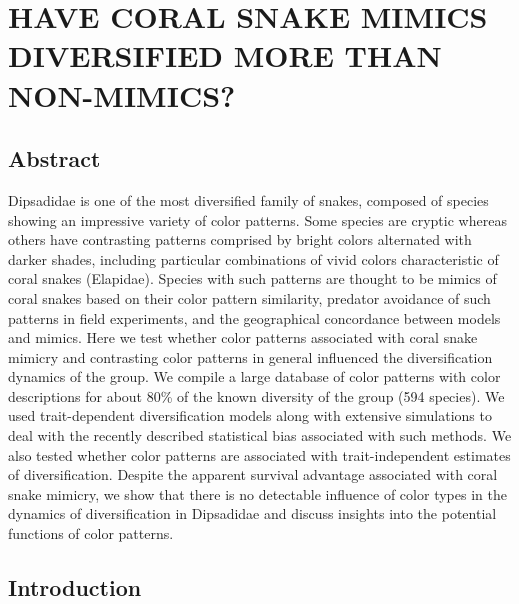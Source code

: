 
\chapter{HAVE CORAL SNAKE MIMICS DIVERSIFIED MORE THAN NON-MIMICS?}

\section{Abstract}

Dipsadidae is one of the most diversified family of snakes, composed of species showing an impressive variety of color patterns. Some species are cryptic whereas others have contrasting patterns comprised by bright colors alternated with darker shades, including particular combinations of vivid colors characteristic of coral snakes (Elapidae). Species with such patterns are thought to be mimics of coral snakes based on their color pattern similarity, predator avoidance of such patterns in field experiments, and the geographical concordance between models and mimics. Here we test whether color patterns associated with coral snake mimicry and contrasting color patterns in general influenced the diversification dynamics of the group. We compile a large database of color patterns with color descriptions for about 80\% of the known diversity of the group (594 species). We used trait-dependent diversification models along with extensive simulations to deal with the recently described statistical bias associated with such methods. We also tested whether color patterns are associated with trait-independent estimates of diversification. Despite the apparent survival advantage associated with coral snake mimicry, we show that there is no detectable influence of color types in the dynamics of diversification in Dipsadidae and discuss insights into the potential functions of color patterns.

\section{Introduction}

